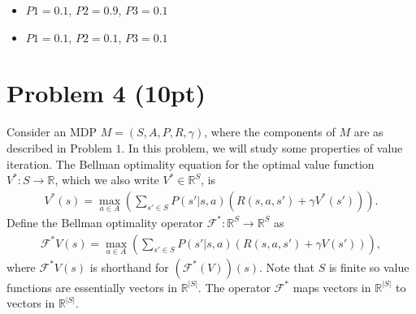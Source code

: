\documentclass[12pt]{article}
\begin{document}
\begin{itemize}
\item $P1 = 0.1$, $P2 = 0.9$, $P3 = 0.1$
\item $P1 = 0.1$, $P2 = 0.1$, $P3 = 0.1$
\end{itemize}

\section*{Problem 4 (10pt)}

Consider an MDP $M = (S, A, P, R, \gamma)$, where the components of 
$M$ are as described in Problem $1$. In this problem, we will study some properties
of value iteration. The Bellman optimality equation for the 
optimal value function $V ^* : S \to \mathbb R$, 
which we also write $V ^* \in \mathbb R ^S$, is
\begin{align*}
  V ^*(s) = \max _{a \in A} 
    \left(
      \sum _{s' \in S} 
        P(s' | s, a) \left(
          R (s, a, s') + \gamma V ^*( s' )
        \right)
    \right) .
\end{align*}
Define the Bellman optimality operator 
$\mathcal F ^* : \mathbb R ^{ S } \to \mathbb R ^{ S }$ as 
\begin{align*}
  \mathcal F ^* V (s) 
    = \max _{a \in A} 
      \left(
        \sum _{s' \in S} 
          P(s' | s, a) \left(
            R (s, a, s') + \gamma V ( s' )
          \right)
      \right) ,
\end{align*}
where $\mathcal F ^* V (s)$ is shorthand for $( \mathcal F ^* ( V ) ) (s)$.
Note that $S$ is finite so value functions are essentially vectors in 
$\mathbb R ^{ |S| }$. The operator $\mathcal F ^*$ maps vectors in 
$\mathbb R ^{ |S| }$ to vectors in $\mathbb R ^{ |S| }$.
\end{document}
